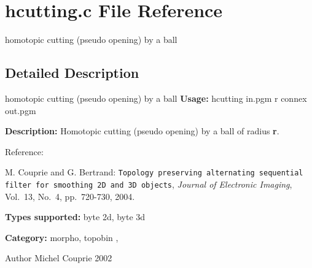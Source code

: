 \section{hcutting.c File Reference}
\label{hcutting_8c}


homotopic cutting (pseudo opening) by a ball  




\subsection{Detailed Description}
homotopic cutting (pseudo opening) by a ball {\bfseries Usage:} hcutting in.pgm r connex out.pgm

{\bfseries Description:} Homotopic cutting (pseudo opening) by a ball of radius {\bfseries r}.

Reference:\par
 [CB04] M. Couprie and G. Bertrand: {\tt Topology preserving alternating sequential filter for smoothing 2D and 3D objects}, {\itshape  Journal of Electronic Imaging\/}, Vol.~13, No.~4, pp.~720-\/730, 2004.

{\bfseries Types supported:} byte 2d, byte 3d

{\bfseries Category:} morpho, topobin ,

\begin{DoxyAuthor}{Author}
Michel Couprie 2002 
\end{DoxyAuthor}
